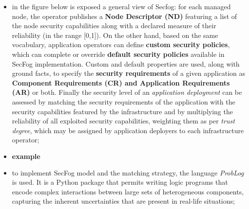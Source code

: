 \documentclass[oneside]{article}
\begin{document}
\begin{itemize}
    \item in the figure below is exposed a general view of Secfog: for each managed node, the operator publishes a \textbf{Node Descriptor (ND)} featuring a list of the node security capabilities along with a declared measure of their reliability (in the range [0,1]). On the other hand, based on the same vocabulary, application operators can define \textbf{custom security policies}, which can complete or override \textbf{default security policies} available in SecFog implementation. Custom and default properties are used, along with ground facts, to specify the \textbf{security requirements} of a given application as \textbf{Component Requirements (CR) and Application Requirements (AR)} or both. Finally the security level of an \textit{application deployment} can be assessed by matching the security requirements of the application with the security capabilities featured by the infrastructure  and by multiplying the reliability of all exploited security capabilities, weighting them as per \textit{trust degree}, which may be assigned by application deployers to each infrastructure operator;
    \begin{figure}[!htb]
    \end{figure}
    
    \item \textbf{example}
    \begin{figure}[!htb]
    \end{figure}
    
    \item to implement SecFog model and the matching strategy, the language \textit{ProbLog} is used. It is a Python package that permits writing logic programs that encode complex interactions between large sets of heterogeneous components, capturing the inherent uncertainties that are present in real-life situations;
    
    
\end{itemize}


\end{document}
